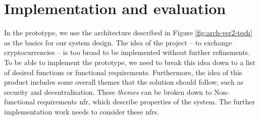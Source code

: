 \section{Implementation and evaluation}
% 
In the prototype, we use the architecture described in Figure \ref{fig:arch-ver2-tech} as the basics for our system design. The idea of the project -- to exchange cryptocurrencies -- is too broad to be implemented without further refinements. To be able to implement the prototype, we need to break this idea down to a list of desired functions or functional requirements. Furthermore, the idea of this product includes some overall themes that the solution should follow, such as security and decentralisation. These \textit{themes} can be broken down to Non-functional requirements \acrshort{nfr}, which describe properties of the system. The further implementation work needs to consider these \acrshort{nfr}s.














